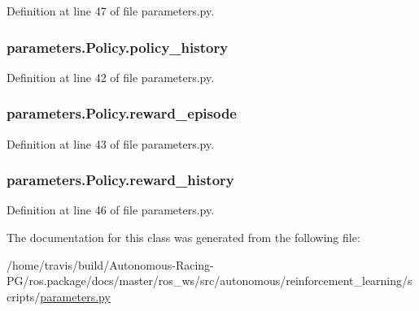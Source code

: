 Definition at line 47 of file parameters.\+py.

\subsubsection[{\texorpdfstring{policy\+\_\+history}{policy_history}}]{\setlength{\rightskip}{0pt plus 5cm}parameters.\+Policy.\+policy\+\_\+history}\hypertarget{classparameters_1_1_policy_acd82a6d1c04d80cf93be0995da717b92}{}\label{classparameters_1_1_policy_acd82a6d1c04d80cf93be0995da717b92}


Definition at line 42 of file parameters.\+py.

\subsubsection[{\texorpdfstring{reward\+\_\+episode}{reward_episode}}]{\setlength{\rightskip}{0pt plus 5cm}parameters.\+Policy.\+reward\+\_\+episode}\hypertarget{classparameters_1_1_policy_a5af351c9adfe2c558517035310d4dee8}{}\label{classparameters_1_1_policy_a5af351c9adfe2c558517035310d4dee8}


Definition at line 43 of file parameters.\+py.

\subsubsection[{\texorpdfstring{reward\+\_\+history}{reward_history}}]{\setlength{\rightskip}{0pt plus 5cm}parameters.\+Policy.\+reward\+\_\+history}\hypertarget{classparameters_1_1_policy_a206a48d384964a49ac0c64d95b33d035}{}\label{classparameters_1_1_policy_a206a48d384964a49ac0c64d95b33d035}


Definition at line 46 of file parameters.\+py.



The documentation for this class was generated from the following file\+:\begin{DoxyCompactItemize}
\item 
/home/travis/build/\+Autonomous-\/\+Racing-\/\+P\+G/ros.\+package/docs/master/ros\+\_\+ws/src/autonomous/reinforcement\+\_\+learning/scripts/\hyperlink{parameters_8py}{parameters.\+py}\end{DoxyCompactItemize}
